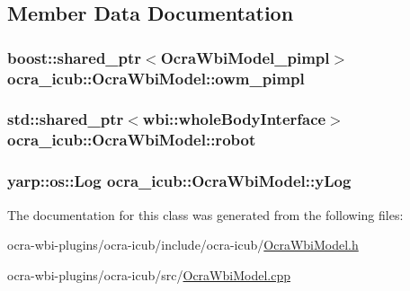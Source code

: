 \subsection{\-Member \-Data \-Documentation}
\hypertarget{classocra__icub_1_1OcraWbiModel_ab649cb769ca4edd345b3c09c43a69bde}{
\subsubsection[{owm\-\_\-pimpl}]{\setlength{\rightskip}{0pt plus 5cm}boost\-::shared\-\_\-ptr$<${\bf \-Ocra\-Wbi\-Model\-\_\-pimpl}$>$ {\bf ocra\-\_\-icub\-::\-Ocra\-Wbi\-Model\-::owm\-\_\-pimpl}}}\label{classocra__icub_1_1OcraWbiModel_ab649cb769ca4edd345b3c09c43a69bde}
\hypertarget{classocra__icub_1_1OcraWbiModel_ae377f000580656227fa9ef69f2f2e71d}{
\subsubsection[{robot}]{\setlength{\rightskip}{0pt plus 5cm}std\-::shared\-\_\-ptr$<$wbi\-::whole\-Body\-Interface$>$ {\bf ocra\-\_\-icub\-::\-Ocra\-Wbi\-Model\-::robot}}}\label{classocra__icub_1_1OcraWbiModel_ae377f000580656227fa9ef69f2f2e71d}
\hypertarget{classocra__icub_1_1OcraWbiModel_a047fe9f9a96794af218ea844f09cd402}{
\subsubsection[{y\-Log}]{\setlength{\rightskip}{0pt plus 5cm}yarp\-::os\-::\-Log {\bf ocra\-\_\-icub\-::\-Ocra\-Wbi\-Model\-::y\-Log}}}\label{classocra__icub_1_1OcraWbiModel_a047fe9f9a96794af218ea844f09cd402}


\-The documentation for this class was generated from the following files\-:\begin{DoxyCompactItemize}
\item 
ocra-\/wbi-\/plugins/ocra-\/icub/include/ocra-\/icub/\hyperlink{OcraWbiModel_8h}{\-Ocra\-Wbi\-Model.\-h}\item 
ocra-\/wbi-\/plugins/ocra-\/icub/src/\hyperlink{OcraWbiModel_8cpp}{\-Ocra\-Wbi\-Model.\-cpp}\end{DoxyCompactItemize}

